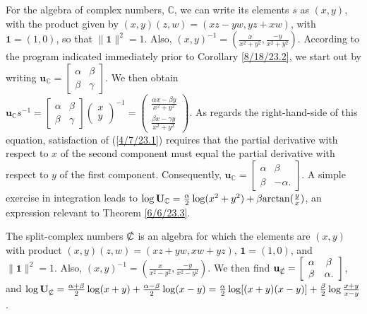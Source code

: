 \documentclass{amsart}
\numberwithin{equation}{section}
\theoremstyle{definition}
\numberwithin{theorem}{section}
\begin{document}
For the algebra of complex numbers, $\mathbb{C}$, we can write its elements $s$ as $(x,y)$, with the product given by $(x,y)(z,w) = (xz-yw, yz+xw)$, with $\mathbf{1}=(1,0)$, so that $\|\mathbf{1}\|^2=1$.  Also, $(x,y)^{-1} = (\frac{x}{x^2+y^2},\frac{-y}{x^2+y^2})$.  According to the program indicated immediately prior to Corollary \ref{8/18/23.2}, we start out by writing  $\mathbf{u}_\mathbb{C} = \left[\begin{array}{ccc}
 \alpha & \beta   \\ 
 \beta & \gamma    
\end{array}\right]$.  We then obtain  $\mathbf{u}_\mathbb{C}s^{-1} = \left[\begin{array}{ccc}
 \alpha & \beta   \\ 
 \beta & \gamma    
\end{array}\right]\left(\begin{array}{ccc}
x   \\ 
y   
\end{array}\right)^{-1} = \left(\begin{array}{ccc}
\frac{\alpha x - \beta y}{x^2+y^2}  \\ 
\frac{\beta x - \gamma y}{x^2+y^2} 
\end{array}\right)$.  As regards the right-hand-side of this equation, satisfaction of (\ref{4/7/23.1}) requires that the partial derivative with respect to $x$ of the second component must equal the partial derivative with respect to $y$ of the first component.  Consequently, $\mathbf{u}_{\mathbb{C}} = \left[\begin{array}{ccc}
 \alpha & \beta   \\ 
 \beta & -\alpha.    
\end{array}\right]$.  A simple exercise in integration leads to $\log  \mathbf{U}_{\mathbb{C}} = \frac{\alpha}{2}\log(x^2+y^2) + \beta{\rm arctan}(\frac{y}{x})$, an expression relevant to Theorem \ref{6/6/23.3}.

The split-complex numbers $\slashed{\mathbb{C}}$ is an algebra for which the elements are  $(x,y)$ with product $(x,y)(z,w) = (xz+yw,xw+yz)$, $ \mathbf{1} = (1,0)$, and $\|\mathbf{1}\|^2 = 1$.  Also, $(x,y)^{-1} = (\frac{x}{x^2-y^2},\frac{-y}{x^2-y^2})$.  We then find $\mathbf{u}_{\slashed{\mathbb{C}}} = \left[\begin{array}{ccc}
 \alpha & \beta   \\ 
 \beta & \alpha.    
\end{array}\right]$, and $\log  \mathbf{U}_{\slashed{\mathbb{C}}} = \frac{\alpha+\beta}{2}\log(x+y) + \frac{\alpha-\beta}{2}\log(x-y) = \frac{\alpha}{2}\log[(x+
y)(x-y)] +  \frac{\beta}{2}\log \frac{x+y}{x-y}$.
\end{document}
